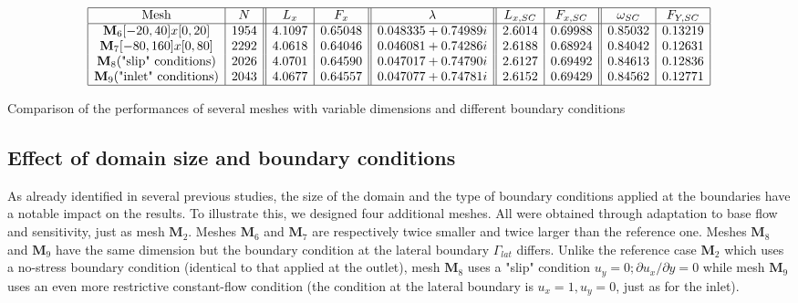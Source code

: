 \documentclass[twocolumn,10pt]{asme2ej}
\begin{document}
 
 \begin{table*}
$$
\begin{array}{|c|c||c|c||c||c|c||c|c|}
\hline
\mbox{Mesh} & N & L_x & F_x & \lambda & L_{x,SC} & F_{x,SC} & \omega_{SC}  & F_{Y,SC} \\%
\hline
\mathbf{M}_6 [-20,40]x[0,20] 			& 1954	&  4.1097 & 0.65048 	& 0.048335+0.74989i 	& 2.6014  & 0.69988 & 0.85032 & 0.13219 \\%
\mathbf{M}_7 [-80,160]x[0,80] 			& 2292	& 4.0618 & 0.64046		& 0.046081+0.74286i 	& 2.6188 	& 0.68924 	& 0.84042 & 0.12631 \\%
\mathbf{M}_8 \mbox{("slip" conditions)}	 & 2026	& 4.0701 &0.64590		& 0.047017+0.74790i	& 2.6127 	& 0.69492		& 0.84613 & 0.12836 \\%
\mathbf{M}_9 \mbox{("inlet" conditions)}	 & 2043	& 4.0677 &0.64	557	& 0.047077+0.74781i	& 2.6152 	& 0.69429		& 0.84562  & 0.12771 \\%
\hline
\end{array}
$$
\caption{Comparison of the performances of several meshes with variable dimensions and different boundary conditions}
\label{tab:conv3}
\end{table*}






\subsection{Effect of domain size and boundary conditions}

As already identified in several previous studies, the size of the domain and the type of boundary conditions applied at the boundaries have a notable impact on the results. To illustrate this, we designed four additional meshes. All were obtained through adaptation to base flow and sensitivity, just as mesh $\mathbf{M}_2$.
Meshes $\mathbf{M}_6$ and $\mathbf{M}_7$ are respectively twice smaller and twice larger than the reference one. 
Meshes $\mathbf{M}_8$ and $\mathbf{M}_9$ have the same dimension but the boundary condition at the lateral boundary
 $\Gamma_{lat}$ differs. Unlike the reference case $\mathbf{M}_2$ which uses a no-stress boundary condition (identical to that applied at the outlet), mesh $\mathbf{M}_8$ uses a "slip" condition $u_y = 0 ; \partial u_x/\partial y = 0$ while mesh $\mathbf{M}_9$ uses an even more restrictive constant-flow condition (the condition at the lateral boundary is $u_x = 1, u_y = 0$, just as for the inlet).
 
\end{document}
